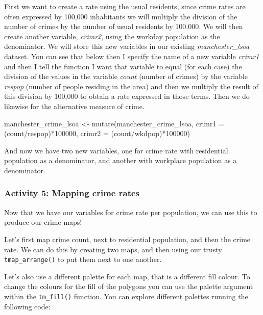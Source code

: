 \documentclass[
]{book}
\newenvironment{Shaded}{\begin{snugshade}}{\end{snugshade}}
\newcommand{\AttributeTok}[1]{\textcolor[rgb]{0.77,0.63,0.00}{#1}}
\newcommand{\DecValTok}[1]{\textcolor[rgb]{0.00,0.00,0.81}{#1}}
\newcommand{\FunctionTok}[1]{\textcolor[rgb]{0.00,0.00,0.00}{#1}}
\newcommand{\NormalTok}[1]{#1}
\newcommand{\OtherTok}[1]{\textcolor[rgb]{0.56,0.35,0.01}{#1}}
\newcommand{\SpecialCharTok}[1]{\textcolor[rgb]{0.00,0.00,0.00}{#1}}
\begin{document}
First we want to create a rate using the usual residents, since crime rates are often expressed by 100,000 inhabitants we will multiply the division of the number of crimes by the number of usual residents by 100,000. We will then create another variable, \emph{crimr2}, using the workday population as the denominator. We will store this new variables in our existing \emph{manchester\_lsoa} dataset. You can see that below then I specify the name of a new variable \emph{crimr1} and then I tell the function I want that variable to equal (for each case) the division of the values in the variable \emph{count} (number of crimes) by the variable \emph{respop} (number of people residing in the area) and then we multiply the result of this division by 100,000 to obtain a rate expressed in those terms. Then we do likewise for the alternative measure of crime.

\begin{Shaded}
\begin{Highlighting}[]
\NormalTok{manchester\_crime\_lsoa }\OtherTok{\textless{}{-}} \FunctionTok{mutate}\NormalTok{(manchester\_crime\_lsoa, }\AttributeTok{crimr1 =}\NormalTok{ (count}\SpecialCharTok{/}\NormalTok{respop)}\SpecialCharTok{*}\DecValTok{100000}\NormalTok{, }\AttributeTok{crimr2 =}\NormalTok{ (count}\SpecialCharTok{/}\NormalTok{wkdpop)}\SpecialCharTok{*}\DecValTok{100000}\NormalTok{)}
\end{Highlighting}
\end{Shaded}

And now we have two new variables, one for crime rate with residential population as a denominator, and another with workplace population as a denominator.

\hypertarget{activity-5-mapping-crime-rates}{%
\subsubsection{Activity 5: Mapping crime rates}\label{activity-5-mapping-crime-rates}}

Now that we have our variables for crime rate per population, we can use this to produce our crime maps!

Let's first map crime count, next to residential population, and then the crime rate. We can do this by creating two maps, and then using our trusty \texttt{tmap\_arrange()} to put them next to one another.

Let's also use a different palette for each map, that is a different fill colour. To change the colours for the fill of the polygons you can use the palette argument within the \texttt{tm\_fill()} function. You can explore different palettes running the following code:
\end{document}
